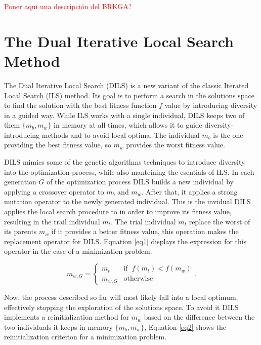 \documentclass[review]{elsarticle}
\begin{document}
\textcolor{red}{Poner aqui una descripción del BRKGA?}

\clearpage 

\section{The Dual Iterative Local Search Method}

The Dual Iterative Local Search (DILS) is a new variant of the classic Iterated Local Search (ILS) method. Its goal is to perform a search in the solutions space to find the solution with the best fitness function $f$ value by introducing diversity in a guided way. While ILS works with a single individual, DILS keeps two of them $\{m_b, m_w\}$ in memory at all times, which allows it to guide diversity-introducing methods and to avoid local optima. The individual $m_b$ is the one providing the best fitness value, so $m_w$ provides the worst fitness value.

DILS mimics some of the genetic algorithms techniques to introduce diversity into the optimization process, while also manteining the esentials of ILS. In each generation $G$ of the optimization process DILS builds a new individual by applying a crossover operator to $m_b$ and $m_w$. After that, it applies a strong mutation operator to the newly generated individual. This is the invidual DILS applies the local search procedure to in order to improve its fitness value, resulting in the trail individual $m_t$. The trial individual $m_t$ replace the worst of its parents $m_w$ if it provides a better fitness value, this operation makes the replacement operator for DILS. Equation \ref{eq1} displays the expression for this operator in the case of a minimization problem.

\begin{equation}
m_{w,G} = \left\{ \begin{array}{lc}
m_t &   \text{if} \;\; f(m_t) < f(m_w)\\
m_{w,G} &  \text{otherwise}
\end{array}
\right..
\label{eq1}
\end{equation}

Now, the process described so far will most likely fall into a local optimum, effectively stopping the exploration of the solutions space. To avoid it DILS implements a reinitialization method for $m_w$ based on the difference between the two individuals it keeps in memory $\{m_b, m_w\}$, Equation \ref{eq2} shows the reinitialization criterion for a minimization problem.
\end{document}

